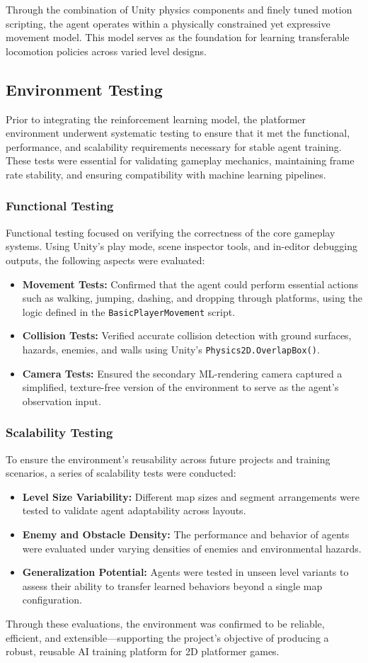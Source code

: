 \documentclass[12pt,oneside,openright,a4paper]{cpe-english-project}
\begin{document}
Through the combination of Unity physics components and finely tuned motion scripting, the agent operates within a physically constrained yet expressive movement model. This model serves as the foundation for learning transferable locomotion policies across varied level designs.

\subsection{Environment Testing}
Prior to integrating the reinforcement learning model, the platformer environment underwent systematic testing to ensure that it met the functional, performance, and scalability requirements necessary for stable agent training. These tests were essential for validating gameplay mechanics, maintaining frame rate stability, and ensuring compatibility with machine learning pipelines.
\subsubsection{Functional Testing}
Functional testing focused on verifying the correctness of the core gameplay systems. Using Unity’s play mode, scene inspector tools, and in-editor debugging outputs, the following aspects were evaluated:
\begin{itemize}
\item  \textbf{Movement Tests:} Confirmed that the agent could perform essential actions such as walking, jumping, dashing, and dropping through platforms, using the logic defined in the \texttt{BasicPlayerMovement} script.
\item  \textbf{Collision Tests:} Verified accurate collision detection with ground surfaces, hazards, enemies, and walls using Unity’s \texttt{Physics2D.OverlapBox()}.
\item  \textbf{Camera Tests:} Ensured the secondary ML-rendering camera captured a simplified, texture-free version of the environment to serve as the agent’s observation input.
\end{itemize}
\subsubsection{Scalability Testing}
To ensure the environment’s reusability across future projects and training scenarios, a series of scalability tests were conducted:
\begin{itemize}
\item  \textbf{Level Size Variability:} Different map sizes and segment arrangements were tested to validate agent adaptability across layouts.
\item  \textbf{Enemy and Obstacle Density:} The performance and behavior of agents were evaluated under varying densities of enemies and environmental hazards.
\item  \textbf{Generalization Potential:} Agents were tested in unseen level variants to assess their ability to transfer learned behaviors beyond a single map configuration.
\end{itemize}
Through these evaluations, the environment was confirmed to be reliable, efficient, and extensible—supporting the project’s objective of producing a robust, reusable AI training platform for 2D platformer games.
\end{document}
